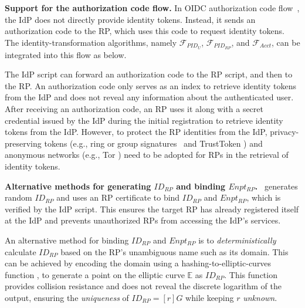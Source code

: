 \noindent \textbf{Support for the authorization code flow.} In OIDC authorization code flow~\cite{OpenIDConnect},
 the IdP does not directly provide identity tokens.
 Instead, it sends an authorization code to the RP, which uses this code to request identity tokens.
 The identity-transformation algorithms, namely $\mathcal{F}_{PID_{U}}$, $\mathcal{F}_{PID_{RP}}$, and $\mathcal{F}_{Acct}$,
  can be integrated into this flow as below. %

The IdP script can forward an authorization code to the RP script,
 and then to the RP. %
 An authorization code only serves as an index to retrieve identity tokens from the IdP
  and does not reveal any information about the authenticated user.
After receiving an authorization code,
 an RP uses it along with a secret credential issued by the IdP during the initial registration \cite{OpenIDConnect}
  to retrieve identity tokens from the IdP.
  However, to protect the RP identities from the IdP, privacy-preserving tokens
   (e.g., ring or group signatures~\cite{ring-sig,chaum1991group} and TrustToken \cite{trusttoken})
   and anonymous networks (e.g., Tor \cite{tor}) need to be adopted for RPs in the retrieval of identity tokens.

\noindent \textbf{Alternative methods for generating $ID_{RP}$ and binding $Enpt_{RP}$.}
\usso~generates random $ID_{RP}$ and uses an RP certificate to bind $ID_{RP}$ and $Enpt_{RP}$, which is verified by the IdP script.
This ensures the target RP has already registered itself at the IdP and prevents unauthorized RPs from accessing the IdP's services.

An alternative method for binding $ID_{RP}$ and $Enpt_{RP}$ is
 to \emph{deterministically} calculate $ID_{RP}$ based on the RP's unambiguous name such as its domain.
 This can be achieved by encoding the domain using a hashing-to-elliptic-curves function \cite{irtf-cfrg-hash-to-curve-16},
  to generate a point on the elliptic curve $\mathbb{E}$ as $ID_{RP}$.
This function \cite{irtf-cfrg-hash-to-curve-16} provides collision resistance
 and does not reveal the discrete logarithm of the output,
  ensuring the \emph{uniqueness} of $ID_{RP} = [r]G$ while keeping $r$ \emph{unknown}. %

